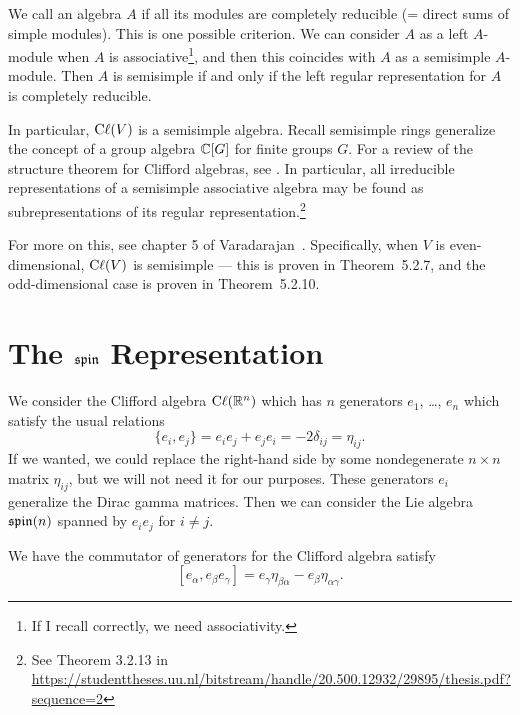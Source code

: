 We call an algebra $A$  if all its modules are
completely reducible (= direct sums of simple modules). This is one
possible criterion. We can consider $A$ as a left $A$-module when $A$ is
associative\footnote{If I recall correctly, we need associativity.}, and
then this coincides with $A$ as a semisimple $A$-module. Then $A$ is
semisimple if and only if the left regular representation for $A$ is
completely reducible.

In particular, $\mathrm{C}\ell(V)$ is a semisimple algebra. Recall semisimple rings
generalize the concept of a group algebra $\mathbb{C}[G]$ for finite groups
$G$. For a review of the structure theorem for Clifford algebras, see
. In particular, all irreducible representations of a
semisimple associative algebra may be found as subrepresentations of its
regular representation.\footnote{See Theorem 3.2.13 in \url{https://studenttheses.uu.nl/bitstream/handle/20.500.12932/29895/thesis.pdf?sequence=2}}

For more on this, see chapter 5 of Varadarajan~\cite{Varadarajan:2004yz}.
Specifically, when $V$ is even-dimensional, $\mathrm{C}\ell(V)$ is semisimple ---
this is proven in Theorem~5.2.7, and the odd-dimensional case is proven
in Theorem~5.2.10.

\section{The $\operatorname{\mathfrak{spin}}$ Representation}

\M
We consider the Clifford algebra $\mathrm{C}\ell(\mathbb{R}^{n})$ which has $n$ generators
$e_{1}$, \dots, $e_{n}$ which satisfy the usual relations
\begin{equation}\label{eq:spin:clifford-anticommutator}
\{e_{i}, e_{j}\} = e_{i}e_{j} + e_{j}e_{i} = -2\delta_{ij} = \eta_{ij}.
\end{equation}
If we wanted, we could replace the right-hand side by some nondegenerate
$n\times n$ matrix $\eta_{ij}$, but we will not need it for our purposes.
These generators $e_{i}$ generalize the Dirac gamma matrices. Then we
can consider the Lie algebra $\operatorname{\mathfrak{spin}}(n)$ spanned by $e_{i}e_{j}$ for
$i\neq j$.

\begin{lemma}\label{lemma:spin:clifford-algebra:commutator-of-one-and-two}
We have the commutator of generators for the Clifford algebra satisfy
$$[e_{\alpha}, e_{\beta}e_{\gamma}]=e_{\gamma}\eta_{\beta\alpha}-e_{\beta}\eta_{\alpha\gamma}.$$
\end{lemma}

